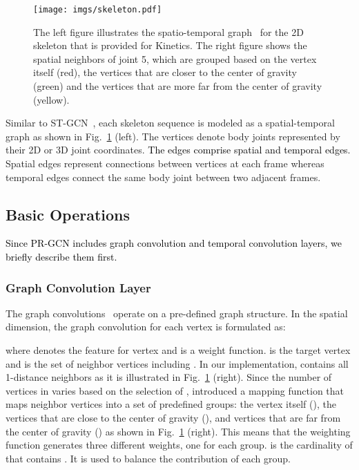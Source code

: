 \documentclass[letterpaper, 10 pt, conference]{ieeeconf}
\newcommand{\todo}[1]{{\textcolor{black}{#1}}}
\begin{document}
\begin{figure}[tbp]
    \centering
    \texttt{[image: imgs/skeleton.pdf]}
    \caption{The left figure illustrates the spatio-temporal graph~\cite{yan2018spatial} for the 2D skeleton that is provided for Kinetics. The right figure shows the spatial neighbors of joint 5, which are grouped based on the vertex itself (red), the vertices that are closer to the center of gravity (green) and the vertices that are more far from the center of gravity (yellow). 
    }
\label{fig:skeleton}
    \vspace{-2mm}
\end{figure}


Similar to ST-GCN~\cite{yan2018spatial}, each skeleton sequence is modeled as a spatial-temporal graph  as shown in Fig.~\ref{fig:skeleton} (left).
The vertices  denote body joints represented by their 2D or 3D joint coordinates.
\todo{The edges  comprise spatial and temporal edges.} Spatial edges  represent connections between vertices at each frame whereas temporal edges  connect the same body joint between two adjacent frames. 

\subsection{Basic Operations}\label{sec:basic}
\todo{Since PR-GCN includes graph convolution and temporal convolution layers, we briefly describe them first.}

\subsubsection{Graph Convolution Layer}



The graph convolutions~\cite{yan2018spatial} operate on a pre-defined graph structure.
In the spatial dimension, the graph convolution for each vertex  is formulated as: 

where  denotes the feature for vertex  and  is a weight function.  is the target vertex and  is the set of neighbor vertices including . In our implementation,  contains all 1-distance neighbors as it is illustrated in Fig.~\ref{fig:skeleton} (right). 
Since the number of vertices in  varies based on the selection of , \cite{yan2018spatial} introduced a mapping function  that maps neighbor vertices into a set of predefined groups: the vertex itself (), the vertices that are close to the center of gravity (), and vertices that are far from the center of gravity () as shown in Fig.~\ref{fig:skeleton} (right). This means that the weighting function  generates three different weights, one for each group.   
 is the cardinality of  that contains . It is used to balance the contribution of each group.
\end{document}
